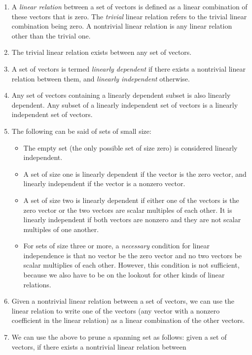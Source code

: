 \documentclass[10pt]{amsart}
\begin{document}
\begin{enumerate}
\item A {\em linear relation} between a set of vectors is defined as a
  linear combination of these vectors that is zero. The {\em trivial}
  linear relation refers to the trivial linear combination being
  zero. A nontrivial linear relation is any linear relation other than
  the trivial one.
\item The trivial linear relation exists between any set of vectors.
\item A set of vectors is termed {\em linearly dependent} if there
  exists a nontrivial linear relation between them, and {\em linearly
    independent} otherwise.
\item Any set of vectors containing a linearly dependent subset is
  also linearly dependent. Any subset of a linearly independent set of
  vectors is a linearly independent set of vectors.
\item The following can be said of sets of small size:
  \begin{itemize}
  \item The empty set (the only possible set of size zero) is
    considered linearly independent.
  \item A set of size one is linearly dependent if the vector is the
    zero vector, and linearly independent if the vector is a nonzero
    vector.
  \item A set of size two is linearly dependent if either one of the
    vectors is the zero vector or the two vectors are scalar multiples
    of each other. It is linearly independent if both vectors are
    nonzero and they are not scalar multiples of one another.
  \item For sets of size three or more, a {\em necessary} condition
    for linear independence is that no vector be the zero vector and
    no two vectors be scalar multiplies of each other. However, this
    condition is not sufficient, because we also have to be on the
    lookout for other kinds of linear relations.
  \end{itemize}
\item Given a nontrivial linear relation between a set of vectors, we
  can use the linear relation to write one of the vectors (any vector
  with a nonzero coefficient in the linear relation) as a linear
  combination of the other vectors.
\item We can use the above to prune a spanning set as follows: given a
  set of vectors, if there exists a nontrivial linear relation between

\end{enumerate}
\end{document}
